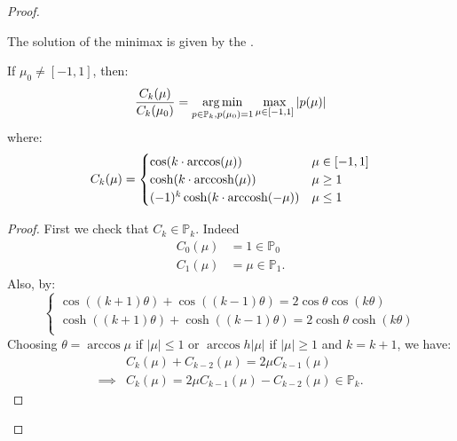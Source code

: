 \documentclass[../main/main.tex]{subfiles}
\begin{document}
\begin{proof}
\begin{enumerate}
        The solution of the minimax is given by the .
\end{enumerate}
\begin{lemma}
  If $\mu _{0}\neq [-1,1]$, then: \[
    \frac{C_{k}(\mu)}{C_{k}(\mu_{0})} = \operatorname*{arg\,min}_{p\in \mathbb{P}_{k}, p(\mu_{0})=1}\max_{\mu  \in [-1,1]} |p(\mu)|
  \] where: \[
C_{k}(\mu) = \begin{cases}
 \cos (k\cdot \arccos(\mu)) & \mu  \in [-1,1]\\
 \cosh (k\cdot \operatorname*{arccosh}(\mu)) & \mu \geq 1\\
(-1)^{k} \cosh (k\cdot \operatorname*{arccosh}(-\mu)) & \mu \leq  1
\end{cases}
  \]
\end{lemma}
\begin{proof}
  First we check that $C_{k} \in  \mathbb{P}_{k}$. Indeed \begin{align*}
                                                            C_{0}(\mu)&=1\in \mathbb{P}_{0}\\
                                                            C_{1}(\mu) &= \mu \in \mathbb{P}_{1}
                                                            .\end{align*} Also, by: \[
\begin{cases}
  \cos ((k+1)\theta ) + \cos ((k-1)\theta) = 2\cos \theta  \cos (k\theta)\\
  \cosh ((k+1)\theta ) + \cosh ((k-1)\theta) = 2\cosh \theta  \cosh (k\theta)\\
\end{cases} \] Choosing $\theta  = \arccos  \mu $ if $|\mu |\leq 1$ or $\arccos h |\mu |$ if $|\mu |\geq 1$ and $k = k+1$, we have:
\begin{align*}
  &C_{k}(\mu)+C_{k-2}(\mu) = 2 \mu C_{k-1}(\mu)\\
  \implies & C_{k}(\mu) = 2\mu C_{k-1}(\mu)-C_{k-2}(\mu) \in \mathbb{P}_{k}
  .\end{align*}
\end{proof}


\end{proof}
\end{document}
